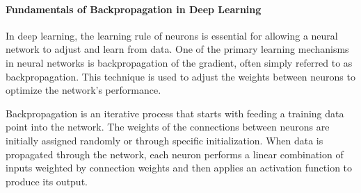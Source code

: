 \documentclass[11pt]{article}
\begin{document}
    \paragraph{Fundamentals of Backpropagation in Deep Learning} In deep learning, the learning rule of neurons is essential for allowing a neural network to adjust and learn from data. One of the primary learning mechanisms in neural networks is backpropagation of the gradient, often simply referred to as backpropagation. This technique is used to adjust the weights between neurons to optimize the network's performance.

    Backpropagation is an iterative process that starts with feeding a training data point into the network. The weights of the connections between neurons are initially assigned randomly or through specific initialization. When data is propagated through the network, each neuron performs a linear combination of inputs weighted by connection weights and then applies an activation function to produce its output.
\end{document}
